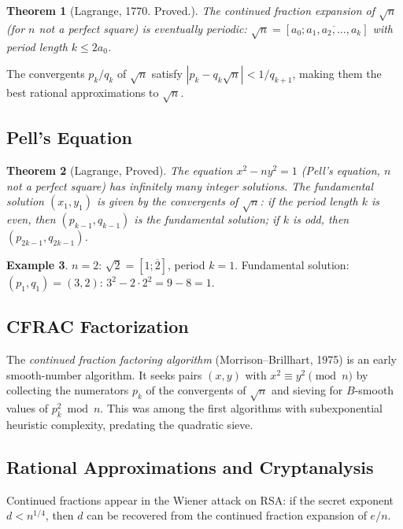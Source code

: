 \documentclass[12pt,a4paper]{amsart}
\newtheorem{theorem}{Theorem}[section]
\theoremstyle{definition}
\newtheorem{example}[theorem]{Example}
\begin{document}
\begin{theorem}[Lagrange, 1770. Proved.]
The continued fraction expansion of $\sqrt{n}$ (for $n$ not a perfect square)
is eventually periodic:
$\sqrt{n} = [a_0; \overline{a_1, a_2, \ldots, a_k}]$ with period length
$k \le 2a_0$.
\end{theorem}

The convergents $p_k/q_k$ of $\sqrt{n}$ satisfy $|p_k - q_k\sqrt{n}| < 1/q_{k+1}$,
making them the best rational approximations to $\sqrt{n}$.

\subsection{Pell's Equation}

\begin{theorem}[Lagrange, Proved]
The equation $x^2 - ny^2 = 1$ (Pell's equation, $n$ not a perfect square)
has infinitely many integer solutions. The fundamental solution $(x_1, y_1)$
is given by the convergents of $\sqrt{n}$: if the period length $k$ is even,
then $(p_{k-1}, q_{k-1})$ is the fundamental solution; if $k$ is odd, then
$(p_{2k-1}, q_{2k-1})$.
\end{theorem}

\begin{example}
$n=2$: $\sqrt{2} = [1;\overline{2}]$, period $k=1$. Fundamental solution:
$(p_1, q_1) = (3, 2)$: $3^2 - 2\cdot 2^2 = 9 - 8 = 1$.
\end{example}

\subsection{CFRAC Factorization}

The \emph{continued fraction factoring algorithm} (Morrison--Brillhart, 1975)
is an early smooth-number algorithm. It seeks pairs $(x,y)$ with
$x^2 \equiv y^2 \pmod{n}$ by collecting the numerators $p_k$ of the
convergents of $\sqrt{n}$ and sieving for $B$-smooth values of
$p_k^2 \bmod n$. This was among the first algorithms with
subexponential heuristic complexity, predating the quadratic sieve.

\subsection{Rational Approximations and Cryptanalysis}

Continued fractions appear in the Wiener attack on RSA: if the secret
exponent $d < n^{1/4}$, then $d$ can be recovered from the continued
fraction expansion of $e/n$.
\end{document}
